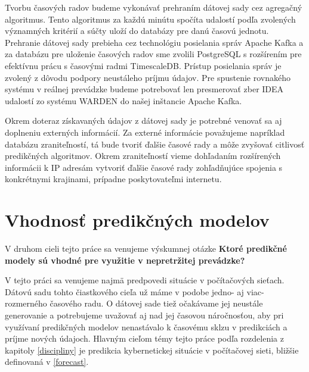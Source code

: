 \documentclass[thesismargins, thesislinespacing, openright, upjsfrontpage, combineabstracts]{rnthesis}
\begin{document}
Tvorbu časových radov budeme vykonávať prehraním dátovej sady cez agregačný algoritmus. Tento algoritmus za každú minútu spočíta udalostí podľa zvolených významných kritérií a súčty uloží do databázy pre danú časovú jednotu. Prehranie dátovej sady prebieha cez technológiu posielania správ Apache Kafka a za databázu pre uloženie časových radov sme zvolili PostgreSQL s rozšírením pre efektívnu prácu s časovými radmi TimescaleDB. Prístup posielania správ je zvolený z dôvodu podpory neustáleho príjmu údajov. Pre spustenie rovnakého systému v reálnej prevádzke budeme potrebovať len presmerovať zber IDEA udalostí zo systému WARDEN do našej inštancie Apache Kafka.

Okrem doteraz získavaných údajov z dátovej sady je potrebné venovať sa aj doplneniu externých informácií. Za externé informácie považujeme napríklad databázu zraniteľností, tá bude tvoriť ďalšie časové rady a môže zvyšovať citlivosť predikčných algoritmov. Okrem zraniteľností vieme dohľadaním rozšírených informácii k IP adresám vytvoriť ďalšie časové rady zohľadňujúce spojenia s konkrétnymi krajinami, prípadne poskytovateľmi internetu.

\section{Vhodnosť predikčných modelov}
V druhom cieli tejto práce sa venujeme výskumnej otázke \textbf{Ktoré predikčné modely sú vhodné pre využitie v nepretržitej prevádzke?}

V tejto práci sa venujeme najmä predpovedi situácie v počítačových sieťach. Dátovú sadu tohto čiastkového cieľa už máme v podobe jedno- aj viac- rozmerného časového radu. O dátovej sade tiež očakávame jej neustále generovanie a potrebujeme uvažovať aj nad jej časovou náročnosťou, aby pri využívaní predikčných modelov nenastávalo k časovému sklzu v predikciách a príjme nových údajoch. Hlavným cieľom témy tejto práce podľa rozdelenia z kapitoly \ref{discipliny} je predikcia kybernetickej situácie v počítačovej sieti, bližšie definovaná v \ref{forecast}.

\end{document}
